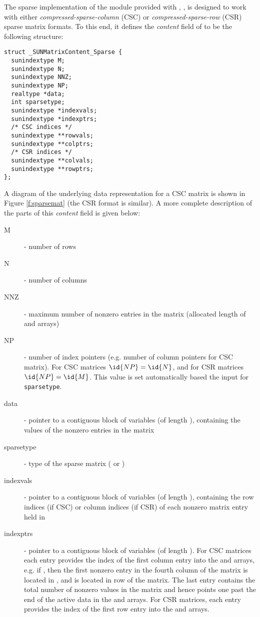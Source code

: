 
The sparse implementation of the {\sunmatrix} module provided with
{\sundials}, {\sunmatsparse}, is designed to work with either
\emph{compressed-sparse-column} (CSC) or \emph{compressed-sparse-row}
(CSR) sparse matrix formats.  To this end, it defines the {\em
content} field of  to be the following structure:
\begin{verbatim} 
struct _SUNMatrixContent_Sparse {
  sunindextype M;
  sunindextype N;
  sunindextype NNZ;
  sunindextype NP;
  realtype *data;
  int sparsetype;
  sunindextype *indexvals;
  sunindextype *indexptrs;
  /* CSC indices */
  sunindextype **rowvals;
  sunindextype **colptrs;
  /* CSR indices */
  sunindextype **colvals;
  sunindextype **rowptrs;
};
\end{verbatim}
A diagram of the underlying data representation for a
CSC matrix is shown in Figure \ref{f:sparsemat} (the CSR format is
similar).  A more complete description of the parts of
this \emph{content} field is given below: 
\begin{description}
  \item[M]  - number of rows
  \item[N]  - number of columns
  \item[NNZ]  - maximum number of nonzero entries in the matrix
    (allocated length of  and  arrays)
  \item[NP]  - number of index pointers (e.g. number of column pointers for 
    CSC matrix). For CSC matrices $\id{NP}=\id{N}$, and for CSR
    matrices $\id{NP}=\id{M}$. This value is set automatically based
    the input for \verb|sparsetype|.
  \item[data]  - pointer to a contiguous block of 
    variables (of length ), containing the values of the
    nonzero entries in the matrix
  \item[sparsetype]  - type of the sparse matrix ( or )
  \item[indexvals] - pointer to a contiguous block of  variables
    (of length ), containing the row indices (if CSC) or column
   indices (if CSR) of each nonzero matrix entry held in 
  \item[indexptrs]  - pointer to a contiguous block of 
    variables (of length ). For CSC matrices each 
    entry provides the index of the first column entry into the 
     and  arrays, e.g. if , then 
    the first nonzero entry in the fourth column of the matrix is 
    located in , and is located in row  of the 
    matrix.  The last entry contains the total number of nonzero values in 
    the matrix and hence points one past the end of the active data in the 
     and  arrays. For CSR matrices, each entry provides 
    the index of the first row entry into the  and  
    arrays.
\end{description}
